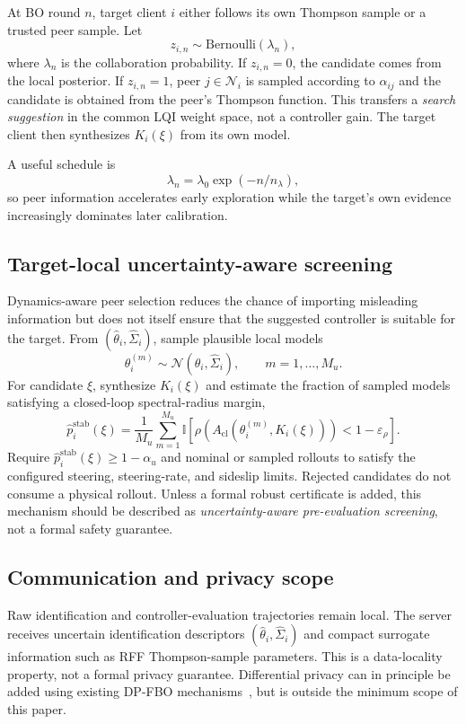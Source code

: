 \documentclass[conference]{IEEEtran}
\begin{document}
At BO round $n$, target client $i$ either follows its own Thompson sample or a trusted peer sample. Let
\begin{equation}
    z_{i,n}\sim\mathrm{Bernoulli}(\lambda_n),
\end{equation}
where $\lambda_n$ is the collaboration probability. If $z_{i,n}=0$, the candidate comes from the local posterior. If $z_{i,n}=1$, peer $j\in\mathcal N_i$ is sampled according to $\alpha_{ij}$ and the candidate is obtained from the peer's Thompson function. This transfers a \emph{search suggestion} in the common LQI weight space, not a controller gain. The target client then synthesizes $K_i(\xi)$ from its own model.

A useful schedule is
\begin{equation}
    \lambda_n=\lambda_0\exp(-n/n_\lambda),
\end{equation}
so peer information accelerates early exploration while the target's own evidence increasingly dominates later calibration.

\subsection{Target-local uncertainty-aware screening}
Dynamics-aware peer selection reduces the chance of importing misleading information but does not itself ensure that the suggested controller is suitable for the target. From $(\hat\theta_i,\hat\Sigma_i)$, sample plausible local models
\begin{equation}
    \theta_i^{(m)}\sim\mathcal N(\hat\theta_i,\hat\Sigma_i),
    \qquad m=1,\ldots,M_u.
\end{equation}
For candidate $\xi$, synthesize $K_i(\xi)$ and estimate the fraction of sampled models satisfying a closed-loop spectral-radius margin,
\begin{equation}
    \hat p_i^{\mathrm{stab}}(\xi)=\frac{1}{M_u}\sum_{m=1}^{M_u}
    \mathbb I\!\left[\rho(A_{\mathrm{cl}}(\theta_i^{(m)},K_i(\xi)))<1-\varepsilon_\rho\right].
\end{equation}
Require $\hat p_i^{\mathrm{stab}}(\xi)\ge1-\alpha_u$ and nominal or sampled rollouts to satisfy the configured steering, steering-rate, and sideslip limits. Rejected candidates do not consume a physical rollout. Unless a formal robust certificate is added, this mechanism should be described as \emph{uncertainty-aware pre-evaluation screening}, not a formal safety guarantee.

\subsection{Communication and privacy scope}
Raw identification and controller-evaluation trajectories remain local. The server receives uncertain identification descriptors $(\hat\theta_i,\hat\Sigma_i)$ and compact surrogate information such as RFF Thompson-sample parameters. This is a data-locality property, not a formal privacy guarantee. Differential privacy can in principle be added using existing DP-FBO mechanisms~\cite{dai2021dpfts}, but is outside the minimum scope of this paper.
\end{document}
